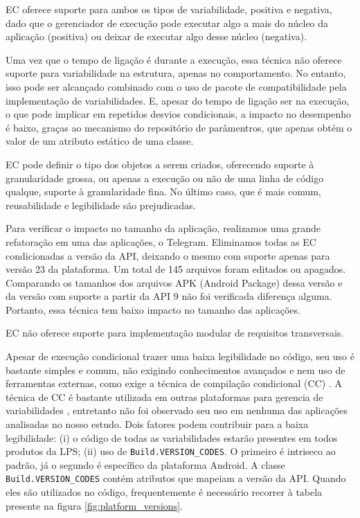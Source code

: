 EC oferece suporte para ambos os tipos de variabilidade, positiva e negativa,
dado que o gerenciador de execução pode executar algo a mais do núcleo da aplicação
(positiva) ou deixar de executar algo desse núcleo (negativa).

Uma vez que o tempo de ligação é durante a  execução, essa técnica não oferece
suporte para variabilidade na estrutura, apenas no comportamento. No entanto,
isso pode ser alcançado combinado com o uso de pacote de compatibilidade pela
implementação de variabilidades. E, apesar do tempo de ligação ser na execução,
o que pode implicar em repetidos desvios condicionais, a impacto no desempenho é
baixo, graças ao mecanismo do repositório de parâmentros, que apenas obtém o valor
de um atributo estático de uma classe.

EC pode definir o tipo dos objetos a serem criados, oferecendo suporte à granularidade
grossa, ou apenas a execução ou não de uma linha de código qualque, suporte à
granularidade fina. No último caso, que é mais comum,  reusabilidade e
legibilidade são prejudicadas.

Para verificar o impacto no tamanho da aplicação, realizamos uma grande refatoração
em uma das aplicações, o Telegram. Eliminamos todas as EC condicionadas a versão da
API, deixando o mesmo com suporte apenas para versão 23 da plataforma. Um total
de 145 arquivos foram editados ou apagados. Comparando os tamanhos dos arquivos
APK (Android Package) dessa versão e da versão com suporte a partir da API 9 não foi verificada
diferença alguma. Portanto, essa técnica tem baixo impacto no tamanho das aplicações.

EC não oferece suporte para implementação modular de requisitos transversais.

Apesar de execução condicional trazer uma baixa legibilidade no código, seu uso
é bastante simples e comum, não exigindo conhecimentos avançados e nem uso de
ferramentas externas, como exige a técnica de compilação condicional (CC) \cite{Medeiros2015}.
A técnica de CC é bastante utilizada em outras plataformas para gerencia de
variabilidades \cite{Liebig2010}, entretanto não foi observado seu uso em
nenhuma das aplicações analisadas no nosso estudo. Dois fatores podem contribuir
para a baixa legibilidade: (i) o código de todas as variabilidades estarão presentes
em todos produtos da LPS; (ii) uso de \texttt{Build.VERSION\_CODES}. O primeiro é 
intriseco ao padrão, já o segundo é específico da plataforma Android. A classe
\texttt{Build.VERSION\_CODES} contém atributos que mapeiam a versão da API. Quando
eles são utilizados no código, frequentemente é necessário recorrer à tabela presente
na figura \ref{fig:platform_versions}.

